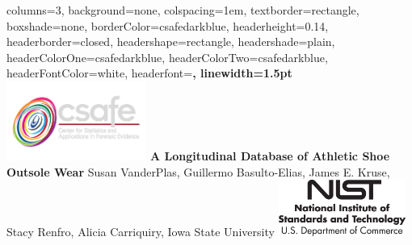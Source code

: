 \documentclass[landscape, a0paper, fontscale=0.275, margin = 30mm]{baposter} %
\newcommand\csafelogo[1][height=7em]{\includegraphics[#1]{figures/logo.png}}
\newcommand\nistlogo[1][height=5em]{\includegraphics[#1]{figures/logo-NIST.jpg}}
\begin{document}
\begin{poster}
{
columns=3,
background=none,
colspacing=1em, %
textborder=rectangle, %
boxshade=none,
borderColor=csafedarkblue,
headerheight=0.14\textheight, %
headerborder=closed, %
headershape=rectangle, %
headershade=plain,
headerColorOne=csafedarkblue,
headerColorTwo=csafedarkblue,
headerFontColor=white,
headerfont=\Large\bf, %
linewidth=1.5pt %
}
%
\csafelogo
{\huge\bf A Longitudinal Database of Athletic Shoe Outsole Wear\vspace{0.3em}} %
{{\Large Susan VanderPlas, Guillermo Basulto-Elias, James E. Kruse, \\Stacy Renfro, Alicia Carriquiry, Iowa State University}\vspace*{-0.6em}} %
\nistlogo



\end{poster}
\end{document}

